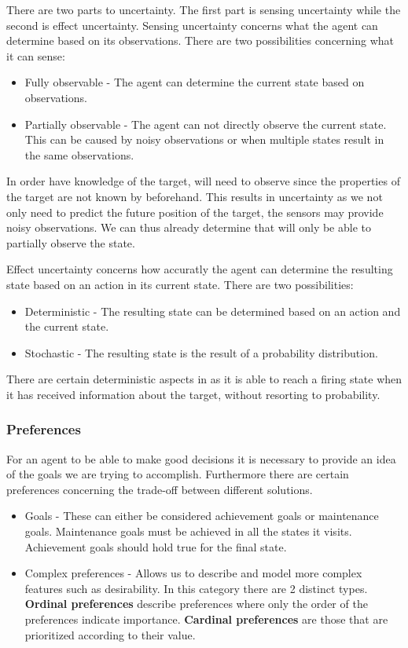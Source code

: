 There are two parts to uncertainty. The first part is sensing uncertainty while
the second is effect uncertainty. Sensing uncertainty concerns what the agent
can determine based on its observations. There are two possibilities concerning
what it can sense:
\begin{itemize}
  \item Fully observable - The agent can determine the current state based on
  observations.
  \item Partially observable - The agent can not directly observe the
  current state. This can be caused by noisy observations or when multiple
  states result in the same observations.
\end{itemize}

In order have knowledge of the target, \name will need to observe since the
properties of the target are not known by \name beforehand. This results in
uncertainty as we not only need to predict the future position of the target,
the sensors may provide noisy observations. We can thus already determine that
\name will only be able to partially observe the state.\nl

Effect uncertainty concerns how accuratly the agent can determine the resulting
state based on an action in its current state. There are two possibilities:
\begin{itemize}
  \item Deterministic - The resulting state can be determined based on an action
  and the current state.
  \item Stochastic - The resulting state is the result of a probability
  distribution.
\end{itemize}

There are certain deterministic aspects in \name as it is able to reach a
firing state when it has received information about the target, without
resorting to probability.
 
\subsubsection{Preferences}
For an agent to be able to make good decisions it is necessary to provide an
idea of the goals we are trying to accomplish. Furthermore there are certain
preferences concerning the trade-off between different solutions.

\begin{itemize}
  \item Goals - These can either be considered achievement goals or
  maintenance goals. Maintenance goals must be achieved in all the states
  it visits. Achievement goals should hold true for the final state.
  \item Complex preferences - Allows us to describe and model more complex
  features such as desirability. In this category there are 2 distinct types.
  \textbf{Ordinal preferences} describe preferences where only the order of the
  preferences indicate importance. \textbf{Cardinal preferences} are those that
  are prioritized according to their value.
\end{itemize}

